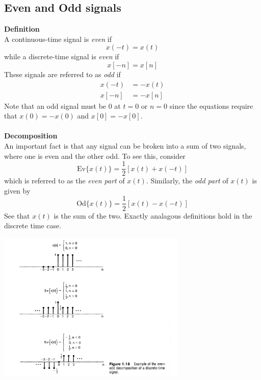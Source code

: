 \documentclass{report}
\begin{document}
\subsection{Even and Odd signals}
\textbf{Definition}\\
A continuous-time signal is \textit{even} if
\begin{equation*}
x(-t)=x(t)
\end{equation*}
while a discrete-time signal is \textit{even} if
\begin{equation*}
x[-n]=x[n]
\end{equation*}
These signals are referred to as \textit{odd} if
\begin{align*}
x(-t)&=-x(t)\\
x[-n]&=-x[n]
\end{align*}
Note that an odd signal must be 0 at $t=0$ or $n=0$ since the equations require that $x(0)=-x(0)$ and $x[0]=-x[0]$.
\\
\vspace{1mm}\\
\textbf{Decomposition}\\
An important fact is that any signal can be broken into a sum of two signals, where one is even and the other odd.
To see this, consider
\begin{equation*}
\text{Ev}\{x(t)\}=\frac{1}{2}[x(t)+x(-t)]
\end{equation*}
which is referred to as the \textit{even part} of $x(t)$. Similarly, the \textit{odd part} of $x(t)$ is given by
\begin{equation*}
\text{Od}\{x(t)\}=\frac{1}{2}[x(t)-x(-t)]
\end{equation*}
See that $x(t)$ is the sum of the two. Exactly analagous definitions hold in the discrete time case.
\begin{center}
\includegraphics[width=9cm]{a1}
\end{center}
\newpage
\end{document}
